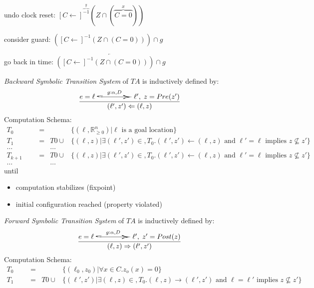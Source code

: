 \documentclass[a4paper, 10pt]{article}
\begin{document}
\begin{mdframed}
\begin{multicols}{2}
undo clock reset: $[C\leftarrow]^{\overset{y}{\overbrace{-1}}}(Z\cap(\overset{x}{\overbrace{C=0}}))$
\begin{center}
\scalebox{.7}{}
\end{center}
consider guard: $([C\leftarrow]^{-1}(Z\cap(C=0)))\cap g$
\begin{center}
\scalebox{.7}{}
\end{center}
go back in time: $\overleftarrow{([C\leftarrow]^{-1}(Z\cap(C=0)))\cap g}$
\begin{center}
\scalebox{.7}{}
\end{center}
\end{multicols}
\emph{Backward Symbolic Transition System} of $TA$ is inductively defined by:
\[ \frac{
    e=\ell \overset{g:\alpha, D}{\scalebox{5}[1]{$\hookrightarrow$}} \ell',\; z=Pre(z')
}{
    (\ell',z')\Leftarrow (\ell,z)
} \]
Computation Schema:
\begin{align*}
T_0 &&&= &&\{(\ell,\mathds{R}_{\geq0}^n) | \ell \text{ is a goal location}\} \\
T_1 &&&= &T0\cup &\{(\ell,z) | \exists(\ell',z')\in,T_0.(\ell',z')\leftarrow(\ell,z) \text{ and } \ell'=\ell \text{ implies } z\not\subseteq z'\} \\
\dots &&& &\dots \\
T_{k+1} &&&= &T0\cup &\{(\ell,z) | \exists(\ell',z')\in,T_0.(\ell',z')\leftarrow(\ell,z) \text{ and } \ell'=\ell \text{ implies } z\not\subseteq z'\} \\
\dots &&& &\dots
\end{align*}
until
\begin{itemize}
    \item computation stabilizes (fixpoint)
    \item initial configuration reached (property violated)
\end{itemize}
\emph{Forward Symbolic Transition System} of $TA$ is inductively defined by:
\[ \frac{
    e=\ell \overset{g:\alpha, D}{\scalebox{5}[1]{$\hookrightarrow$}} \ell',\; z'=Post(z)
}{
    (\ell,z)\Rightarrow (\ell',z')
} \]
Computation Schema:
\begin{align*}
T_0 &&&= &&\{(\ell_0,z_0) | \forall x\in C.z_o(x)=0\} \\
T_1 &&&= &T0\cup &\{(\ell',z') | \exists(\ell,z)\in,T_0.(\ell,z)\rightarrow(\ell',z') \text{ and } \ell=\ell' \text{ implies } z\not\subseteq z'\} \\

\end{align*}
\end{mdframed}
\end{document}
